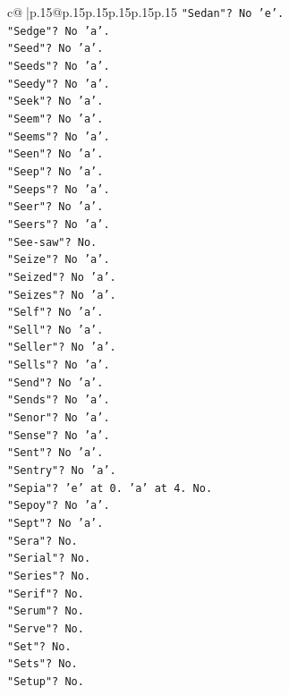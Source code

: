 \documentclass{article}
\begin{document}
{\begin{supertabular}{c@{$\;$}|p{.15\linewidth}@{}p{.15\linewidth}p{.15\linewidth}p{.15\linewidth}p{.15\linewidth}p{.15\linewidth}}
{{{\texttt{"Sedan"? No 'e'.} \\
\texttt{"Sedge"? No 'a'.} \\
\texttt{"Seed"? No 'a'.} \\
\texttt{"Seeds"? No 'a'.} \\
\texttt{"Seedy"? No 'a'.} \\
\texttt{"Seek"? No 'a'.} \\
\texttt{"Seem"? No 'a'.} \\
\texttt{"Seems"? No 'a'.} \\
\texttt{"Seen"? No 'a'.} \\
\texttt{"Seep"? No 'a'.} \\
\texttt{"Seeps"? No 'a'.} \\
\texttt{"Seer"? No 'a'.} \\
\texttt{"Seers"? No 'a'.} \\
\texttt{"See{-}saw"? No.} \\
\texttt{"Seize"? No 'a'.} \\
\texttt{"Seized"? No 'a'.} \\
\texttt{"Seizes"? No 'a'.} \\
\texttt{"Self"? No 'a'.} \\
\texttt{"Sell"? No 'a'.} \\
\texttt{"Seller"? No 'a'.} \\
\texttt{"Sells"? No 'a'.} \\
\texttt{"Send"? No 'a'.} \\
\texttt{"Sends"? No 'a'.} \\
\texttt{"Senor"? No 'a'.} \\
\texttt{"Sense"? No 'a'.} \\
\texttt{"Sent"? No 'a'.} \\
\texttt{"Sentry"? No 'a'.} \\
\texttt{"Sepia"? 'e' at 0. 'a' at 4. No.} \\
\texttt{"Sepoy"? No 'a'.} \\
\texttt{"Sept"? No 'a'.} \\
\texttt{"Sera"? No.} \\
\texttt{"Serial"? No.} \\
\texttt{"Series"? No.} \\
\texttt{"Serif"? No.} \\
\texttt{"Serum"? No.} \\
\texttt{"Serve"? No.} \\
\texttt{"Set"? No.} \\
\texttt{"Sets"? No.} \\
\texttt{"Setup"? No.} \\
}}}
\end{supertabular}}
\end{document}

